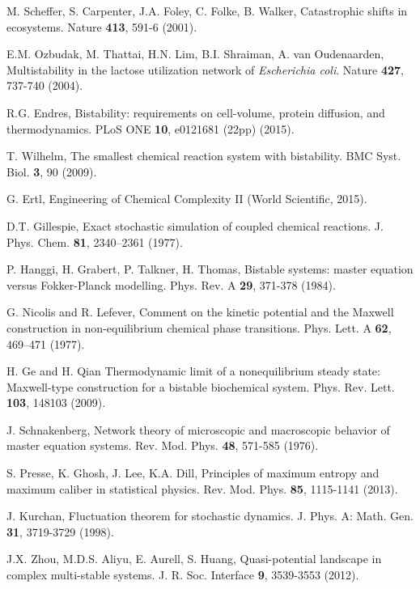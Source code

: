\documentclass[aps,prl,reprint,singlecolumn,superscriptaddress]{revtex4}
\begin{document}
{\begin{thebibliography}{}
 M. Scheffer, S. Carpenter, J.A. Foley, C. Folke, B. Walker, {Catastrophic shifts in ecosystems.} Nature {\bf 413}, 591-6 (2001).

 E.M. Ozbudak, M. Thattai, H.N. Lim, B.I. Shraiman, A. van Oudenaarden, {Multistability in the lactose utilization network of 
{\it Escherichia coli}.} Nature {\bf 427}, 737-740 (2004). 

 R.G. Endres, Bistability: requirements on cell-volume, protein diffusion, and thermodynamics. 
PLoS ONE {\bf 10}, e0121681 (22pp) (2015).

 T. Wilhelm, {The smallest chemical reaction system with bistability.} BMC Syst. Biol. {\bf 3}, 90 (2009).

 G. Ertl, {Engineering of Chemical Complexity II} (World Scientific, 2015).

 D.T. Gillespie, {Exact stochastic simulation of coupled chemical reactions.} J. Phys. Chem. {\bf 81}, 2340–2361 (1977). 

 P. Hanggi, H. Grabert, P. Talkner, H. Thomas, {Bistable systems: master equation versus Fokker-Planck modelling.} Phys. Rev. A {\bf 29}, 371-378 (1984).  

 G. Nicolis and R. Lefever, 
{Comment on the kinetic potential and the Maxwell construction in non-equilibrium chemical phase transitions.} 
Phys. Lett. A {\bf 62}, 469–471 (1977).

 H. Ge and H. Qian {Thermodynamic limit of a nonequilibrium steady state: Maxwell-type construction for a bistable biochemical system.}
Phys. Rev. Lett. {\bf 103}, 148103 (2009).

 J. Schnakenberg, Network theory of microscopic and macroscopic behavior of master equation systems. 
Rev. Mod. Phys. {\bf 48}, 571-585 (1976).

 S. Presse, K. Ghosh, J. Lee, K.A. Dill,
Principles of maximum entropy and maximum caliber in statistical physics.
Rev. Mod. Phys. {\bf 85}, 1115-1141 (2013).

 J. Kurchan, Fluctuation theorem for stochastic dynamics.
J. Phys. A: Math. Gen. {\bf 31}, 3719-3729 (1998).

 J.X. Zhou, M.D.S. Aliyu, E. Aurell, S. Huang, {Quasi-potential landscape in complex multi-stable systems.}
J. R. Soc. Interface {\bf 9}, 3539-3553 (2012).


\end{thebibliography}}
\end{document}
